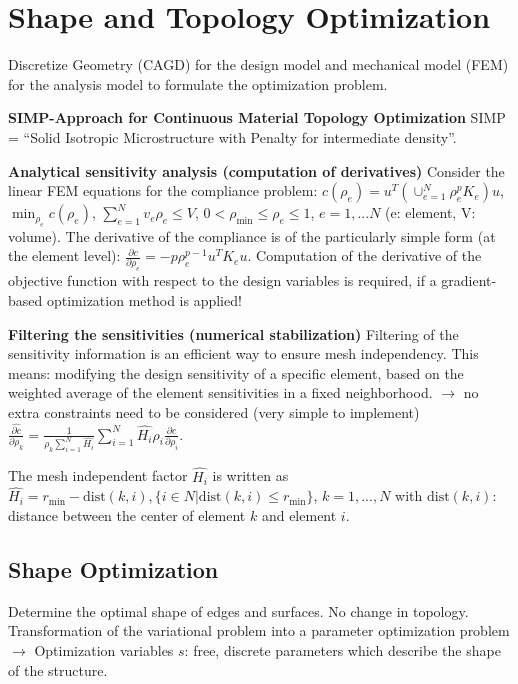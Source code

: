 \section*{Shape and Topology Optimization}
Discretize Geometry (CAGD) for the design model and mechanical model (FEM) for the analysis model to formulate the optimization problem. 

\textbf{SIMP-Approach for Continuous Material Topology Optimization}
SIMP = “Solid Isotropic Microstructure with Penalty for intermediate density”. 

\textbf{Analytical sensitivity analysis (computation of derivatives)}
Consider the linear FEM equations for the compliance problem:
$c(\rho_e) = u^T (\cup_{e=1}^{N}\rho_e^p K_e) u$,
$\min_{\rho_e} c(\rho_e)$, 
$\sum_{e=1}^N v_e \rho_e \leq V$, 
$0 < \rho_{\text{min}}\leq \rho_e \leq 1$, 
$e=1,...N$ (e: element, V: volume).
The derivative of the compliance is of the particularly simple form (at the element level):
$\frac{\partial c}{\partial \rho_e} = -p \rho_e^{p-1} u^T K_e u$.
Computation of the derivative of the objective function with respect to the design variables is required, if a gradient-based optimization method is applied!

\textbf{Filtering the sensitivities (numerical stabilization)}
Filtering of the sensitivity information is an efficient way to ensure mesh independency. 
This means: modifying the design sensitivity of a specific element, based on the weighted average of the
element sensitivities in a fixed neighborhood.
$\rightarrow$ no extra constraints need to be considered (very simple to implement)
$\frac{\hat{\partial c}}{\partial \rho_k} = \frac{1}{\rho_k \sum_{i=1}^N \hat{H_i}} \sum_{i=1}^N \hat{H_i} \rho_i \frac{\partial c}{\partial \rho_i}$.

The mesh independent factor $\hat{H_i}$ is written as
$\hat{H_i} = r_{\text{min}} - \text{dist}(k,i), \{i \in N | \text{dist}(k,i) \leq r_{\text{min}}\}$, 
$k = 1,...,N$ with $\text{dist}(k,i)$: distance between the center of element $k$ and element $i$.

\subsection*{Shape Optimization}
Determine the optimal shape of edges and surfaces. No change in topology.
Transformation of the variational problem into a parameter optimization problem
$\rightarrow$ Optimization variables $s$: free, discrete parameters which describe the shape of the structure.

